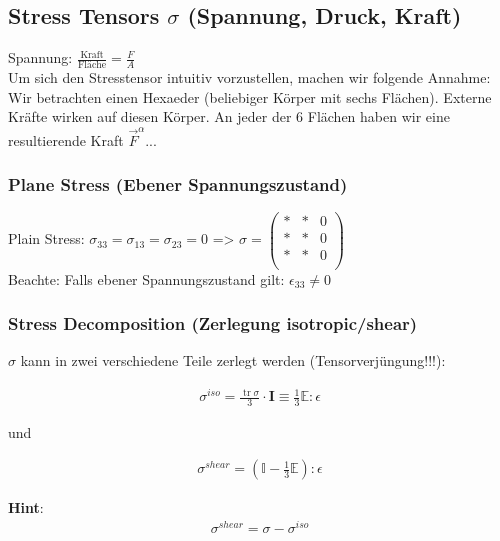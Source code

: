 \documentclass[a4paper, 10pt]{scrartcl}
\begin{document}
\subsection{Stress Tensors $\sigma$ (Spannung, Druck, Kraft)}
Spannung: $\frac{\text{Kraft}}{\text{Fläche}} = \frac{F}{A}$\\

Um sich den Stresstensor intuitiv vorzustellen, machen wir folgende Annahme:
Wir betrachten einen Hexaeder (beliebiger Körper mit sechs Flächen). Externe
Kräfte wirken auf diesen Körper. An jeder der 6 Flächen haben wir eine
resultierende Kraft $\vec F^\alpha$...

\subsubsection{Plane Stress (Ebener Spannungszustand)}
Plain Stress: $\sigma_{33} = \sigma_{13} = \sigma_{23} = 0$ => $\sigma =
\begin{pmatrix}
* & * & 0\\
* & * & 0\\
* & * & 0\\
\end{pmatrix} $\\

Beachte: Falls ebener Spannungszustand gilt: $\epsilon_{33} \neq 0$\\

\subsubsection{Stress Decomposition (Zerlegung isotropic/shear)}
\label{stressdecomposition}

$\sigma$ kann in zwei verschiedene Teile zerlegt werden (Tensorverjüngung!!!):

\begin{align}
	\sigma^{iso}=\frac{\operatorname{tr} \sigma}{3} \cdot \mathbf{I} \equiv
	\frac{1}{3} \mathbb{E} : \epsilon
\end{align}

und

\begin{align}
	\sigma^{shear}= \left(\mathbb{I}- \frac{1}{3}\mathbb{E} \right) : \epsilon
\end{align}

\textbf{Hint}:
\begin{align}
	\sigma^{shear} = \sigma -\sigma^{iso}
\end{align}
\end{document}
